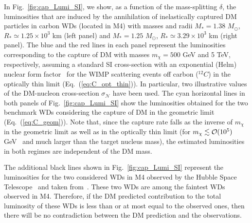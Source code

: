 \documentclass[11pt]{article}
\begin{document}
In Fig.~\ref{fig:cap_Lumi_SI}, we show, as a function of the mass-splitting $\delta$, the luminosities that are induced by the annihilation of inelastically captured DM particles in carbon WDs (located in M4) with masses and radii
$M_* = 1.38$ \(M_\odot\), $R_* \simeq 1.25 \times 10^3$ km (left panel) and 
$M_* = 1.25$ \(M_\odot\), $R_* \simeq 3.29 \times 10^3$ km (right panel).   
The blue and the red lines in each panel represent the luminosities 
corresponding to the capture of DM with masses $m_{\chi} = 500$ GeV and 5 TeV, respectively, assuming a standard SI cross-section with an exponential (Helm) nuclear form factor~\cite{dm_cap_sun_PhysRevD.86.073002, idm_sun_Shu_2010} for the WIMP scattering events off carbon ($^{12}C$) in the optically thin limit (Eq.~(\ref{eq:C_opt_thin})). In particular, two illustrative values of the DM-nucleon cross-section $\sigma_{\mathcal{N}}$ 
have been used. The cyan horizontal lines in both panels of Fig.~\ref{fig:cap_Lumi_SI} 
show the luminosities obtained for the two benchmark WDs 
considering the capture of DM in the geometric limit (Eq.~(\ref{eq:C_geom})).
Note that, since the capture rate falls as the inverse of $m_{\chi}$ in the geometric limit 
as well as in the optically thin limit (for $m_{\chi}\lesssim {\cal O}(10^5)$ GeV~\cite{improved_WD_2021} and much larger than the target nucleus mass), the estimated luminosities in both regimes are independent of the DM mass.

The additional black lines shown in Fig.~\ref{fig:cap_Lumi_SI} represent the luminosities for the two considered WDs in M4 observed by the Hubble Space Telescope~\cite{hubble_WD_2004, hubble_WD_2009} and taken from~\cite{improved_WD_2021}.
These two WDs are among the faintest WDs observed in M4. Therefore, if the DM predicted contribution to the total luminosity of these WDs is less than or at most equal to the observed ones, then there will be no contradiction between the DM prediction and the observations.
\end{document}

